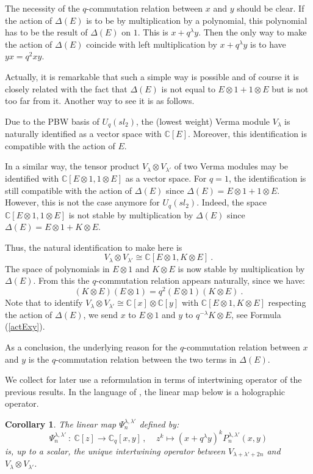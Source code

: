 \documentclass[a4paper,12pt]{article}
\numberwithin{equation}{section}
\newcommand{\C}{\mathbb{C}}
\newtheorem{coro}[theo]{Corollary}
\theoremstyle{rem}
\newenvironment{rema}
  {\pushQED{\qed}\renewcommand{\qedsymbol}{$\scriptstyle{\blacktriangle}$}\remax}
  {\popQED\endremax}
\theoremstyle{definition}
\begin{document}
\begin{rema}
The necessity of the $q$-commutation relation between $x$ and $y$ should be clear. If the action of $\Delta(E)$ is to be by multiplication by a polynomial, this polynomial has to be the result of $\Delta(E)$ on $1$. This is $x+q^{\lambda} y$. Then the only way to make the action of $\Delta(E)$ coincide with left multiplication by $x+q^{\lambda} y$ is to have $yx=q^2xy$. 

Actually, it is remarkable that such a simple way is possible and of course it is closely related with the fact that $\Delta(E)$ is not equal to $E\otimes 1+1\otimes E$ but is not too far from it. Another way to see it is as follows. 

Due to the PBW basis of $U_q(sl_2)$, the (lowest weight) Verma module $V_{\lambda}$ is naturally identified as a vector space with $\mathbb{C}[E]$. Moreover, this identification is compatible with the action of $E$.

In a similar way, the tensor product $V_{\lambda}\otimes V_{\lambda'}$ of two Verma modules may be identified with $\mathbb{C}[E\otimes 1,1\otimes E]$ as a vector space. For $q=1$, the identification is still compatible with the action of $\Delta(E)$ since $\Delta(E)=E\otimes 1+1\otimes E$. However, this is not the case anymore for $U_q(sl_2)$. Indeed, the space $\mathbb{C}[E\otimes 1,1\otimes E]$ is not stable by multiplication by $\Delta(E)$ since $\Delta(E)=E\otimes 1 + K\otimes E$. 

Thus, the natural identification to make here is
$$V_{\lambda}\otimes V_{\lambda'}\cong \mathbb{C}[E\otimes 1,K\otimes E]\ .$$
The space of polynomials in $E\otimes 1$ and $K\otimes E$ is now stable by multiplication by $\Delta(E)$. From this the $q$-commutation relation appears naturally, since we have:
$$(K\otimes E)(E\otimes 1)=q^{2}(E\otimes 1)(K\otimes E)\ .$$
Note that to identify $V_{\lambda}\otimes V_{\lambda'}\cong\mathbb{C}[x]\otimes \mathbb{C}[y]$ with $\mathbb{C}[E\otimes 1,K\otimes E]$ respecting the action of $\Delta(E)$, we send $x$ to $E\otimes 1$ and $y$ to $q^{-\lambda}K\otimes E$, see Formula (\ref{actExy}).

As a conclusion, the underlying reason for the $q$-commutation relation between $x$ and $y$ is the $q$-commutation relation between the two terms in $\Delta(E)$.
\end{rema}


We collect for later use a reformulation in terms of intertwining operator of the previous results. In the language of \cite{KobaPevznerIII}, the linear map below is a holographic operator.
\begin{coro}\label{coroPsixy}
The linear map $\Psi_n^{\lambda,\lambda'}$ defined by:
\begin{equation}
\Psi_n^{\lambda,\lambda'}\ :\ \C[z]\to \C_q[x,y]\,,\ \ \ \ \ z^k\mapsto (x+q^\lambda y)^kP_n^{\lambda,\lambda'}(x,y)
\end{equation}
is, up to a scalar, the unique intertwining operator between $V_{\lambda+\lambda'+2n}$ and $V_\lambda\otimes V_{\lambda'}$. 
\end{coro}
\end{document}
